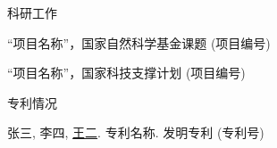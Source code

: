 


{\hei 科研工作}
\begin{publist}
\item “项目名称”，国家自然科学基金课题 (项目编号)
\item “项目名称”，国家科技支撑计划 (项目编号)
\end{publist}


\vspace{1cm}
{\hei 专利情况}
\begin{publist}
\item 张三, 李四, \underline{王二}. 专利名称. 发明专利 (专利号)
\end{publist}

\ifoneortwoside
\newpage
~~~\vspace{1em}
\thispagestyle{empty}
\fi


